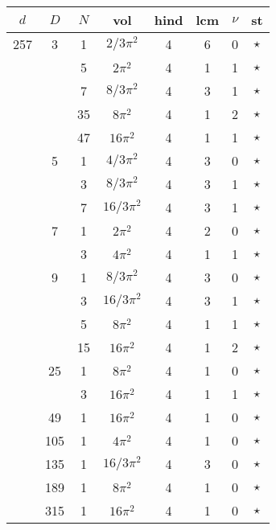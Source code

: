 \documentclass[12pt]{amsart}
\providecommand{\DIFadd}[1]{{\protect\color{blue}\uwave{#1}}} %
\providecommand{\DIFdel}[1]{{\protect\color{red}\sout{#1}}}                      %
\providecommand{\DIFaddbegin}{} %
\providecommand{\DIFaddend}{} %
\providecommand{\DIFdelbegin}{} %
\providecommand{\DIFdelend}{} %
\begin{document}
\begin{tabular}{ccc|ccccc}
$d$ & $D$ & $N$ & vol & hind & lcm & $\nu$ & st\\
\hline
257 & 3 & 1 & \DIFdelbegin \DIFdel{$2/3\pi^2$ }\DIFdelend \DIFaddbegin \DIFadd{$(2/3)\pi^2$ }\DIFaddend & 4 & 6 & 0 & $\star$ \\
 &  & 5 & $2\pi^2$ & 4 & 1 & 1 & $\star$ \\
 &  & 7 & \DIFdelbegin \DIFdel{$8/3\pi^2$ }\DIFdelend \DIFaddbegin \DIFadd{$(8/3)\pi^2$ }\DIFaddend & 4 & 3 & 1 & $\star$ \\
 &  & 35 & $8\pi^2$ & 4 & 1 & 2 & $\star$ \\
 &  & 47 & $16\pi^2$ & 4 & 1 & 1 & $\star$ \\
 & 5 & 1 & \DIFdelbegin \DIFdel{$4/3\pi^2$ }\DIFdelend \DIFaddbegin \DIFadd{$(4/3)\pi^2$ }\DIFaddend & 4 & 3 & 0 & $\star$ \\
 &  & 3 & \DIFdelbegin \DIFdel{$8/3\pi^2$ }\DIFdelend \DIFaddbegin \DIFadd{$(8/3)\pi^2$ }\DIFaddend & 4 & 3 & 1 & $\star$ \\
 &  & 7 & \DIFdelbegin \DIFdel{$16/3\pi^2$ }\DIFdelend \DIFaddbegin \DIFadd{$(16/3)\pi^2$ }\DIFaddend & 4 & 3 & 1 & $\star$ \\
 & 7 & 1 & $2\pi^2$ & 4 & 2 & 0 & $\star$ \\
 &  & 3 & $4\pi^2$ & 4 & 1 & 1 & $\star$ \\
 & 9 & 1 & \DIFdelbegin \DIFdel{$8/3\pi^2$ }\DIFdelend \DIFaddbegin \DIFadd{$(8/3)\pi^2$ }\DIFaddend & 4 & 3 & 0 & $\star$ \\
 &  & 3 & \DIFdelbegin \DIFdel{$16/3\pi^2$ }\DIFdelend \DIFaddbegin \DIFadd{$(16/3)\pi^2$ }\DIFaddend & 4 & 3 & 1 & $\star$ \\
 &  & 5 & $8\pi^2$ & 4 & 1 & 1 & $\star$ \\
 &  & 15 & $16\pi^2$ & 4 & 1 & 2 & $\star$ \\
 & 25 & 1 & $8\pi^2$ & 4 & 1 & 0 & $\star$ \\
 &  & 3 & $16\pi^2$ & 4 & 1 & 1 & $\star$ \\
 & 49 & 1 & $16\pi^2$ & 4 & 1 & 0 & $\star$ \\
 & 105 & 1 & $4\pi^2$ & 4 & 1 & 0 & $\star$ \\
 & 135 & 1 & \DIFdelbegin \DIFdel{$16/3\pi^2$ }\DIFdelend \DIFaddbegin \DIFadd{$(16/3)\pi^2$ }\DIFaddend & 4 & 3 & 0 & $\star$ \\
 & 189 & 1 & $8\pi^2$ & 4 & 1 & 0 & $\star$ \\
 & 315 & 1 & $16\pi^2$ & 4 & 1 & 0 & $\star$ \\

\end{tabular}
\end{document}

